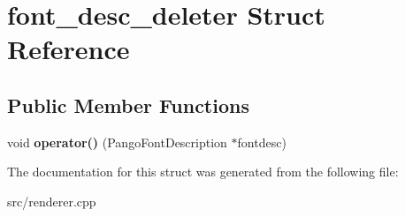 \hypertarget{structfont__desc__deleter}{}\section{font\+\_\+desc\+\_\+deleter Struct Reference}
\label{structfont__desc__deleter}
\subsection*{Public Member Functions}
\begin{DoxyCompactItemize}
\item 
\mbox{\label{structfont__desc__deleter_a831a8889825be20a6fb914bcaf31a726}} 
void {\bfseries operator()} (Pango\+Font\+Description $\ast$fontdesc)
\end{DoxyCompactItemize}


The documentation for this struct was generated from the following file\+:\begin{DoxyCompactItemize}
\item 
src/renderer.\+cpp\end{DoxyCompactItemize}
